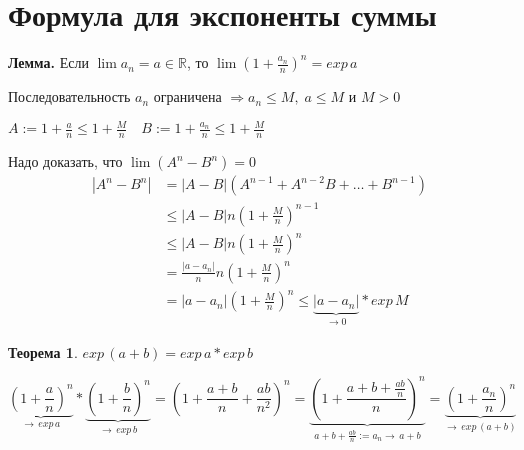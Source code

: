 \documentclass[12pt,letterpaper]{report}
\makeatletter
\newtheorem{theorem}{Теорема}
\renewenvironment{proof}[1][\proofname]{%
   \par\pushQED{\qed}\normalfont%
   \topsep6\p@\@plus6\p@\relax
   \trivlist\item[\hskip\labelsep\bfseries#1\@addpunct{.}]%
   \ignorespaces
}{%
   \popQED\endtrivlist\@endpefalse
}
\makeatother
\begin{document}
\section{Формула для экспоненты суммы}
\textbf{Лемма.}
    Если $\lim a_n = a \in \mathbb{R}$, то $\lim (1 + \frac{a_n}{n})^n = exp\,a$    
\begin{proof}
    Последовательность $a_n$ ограничена $\Rightarrow a_n \leqslant M,\; a \leqslant M$ и $M > 0$
    
    $A := 1 + \frac{a}{n} \leqslant 1 + \frac{M}{n} \quad B:= 1 + \frac{a_n}{n} \leqslant 1 + \frac{M}{n}$
    
    Надо доказать, что $\lim(A^n - B^n) = 0$
    \begin{equation*}
        \begin{split}
            |A^n - B^n| &= |A - B|(A^{n-1} + A^{n-2}B + \dots + B^{n-1}) \\ &\leqslant |A-B|n(1 + \frac{M}{n})^{n-1} \\
            &\leqslant |A-B|n(1 + \frac{M}{n})^n \\ 
            &= \frac{|a-a_n|}{n}n(1 + \frac{M}{n})^n \\
            &= |a - a_n|(1 + \frac{M}{n})^n \leqslant \underbrace{|a-a_n|}_{\to 0}*exp\,M
        \end{split}
    \end{equation*}
\end{proof}
\begin{theorem}
    $exp\,(a+b) = exp\,a * exp\,b$
\end{theorem}
\begin{proof}
    \[ \underbrace{(1 + \frac{a}{n})^n}_{\to\,exp\,a} * \underbrace{(1 + \frac{b}{n})^n}_{\to\,exp\,b} = (1 + \frac{a+b}{n} + \frac{ab}{n^2})^n = \underbrace{(1 + \frac{a + b + \frac{ab}{n}}{n})^n}_{a + b + \frac{ab}{n} := a_n \to\,a + b} = \underbrace{(1 + \frac{a_n}{n})^n}_{\to\,exp\,(a+b)} \]
\end{proof}
\end{document}
